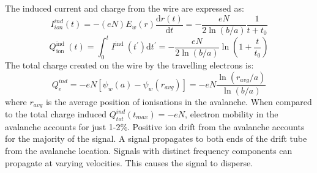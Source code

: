 The induced current and charge from the wire are expressed as:
 \begin{equation}
    I_{i o n}^{i n d}(t)=-(e N) E_w(r) \frac{\mathrm{d} r(t)}{\mathrm{d} t}=-\frac{e N}{2 \ln (b / a)} \frac{1}{t+t_0}
    \end{equation}
    \begin{equation}
        Q_{\text {ion }}^{\text {ind }}(t)=\int_0^t I^{\text {ind }}\left(t^{\prime}\right) \mathrm{d} t^{\prime}=-\frac{e N}{2 \ln (b / a)} \ln \left(1+\frac{t}{t_0}\right)
        \end{equation}
The total charge created on the wire by the travelling electrons is:
\begin{equation}
    Q_e^{i n d}=-e N\left[\psi_w(a)-\psi_w\left(r_{a v g}\right)\right]=-e N \frac{\ln \left(r_{a v g} / a\right)}{\ln (b / a)}
    \end{equation}
    where $r_{avg}$ is the average position of ionisations in the avalanche. When compared to the total charge 
    induced $Q^{ind}_{tot}(t_{max}) = -eN$, electron mobility in the avalanche accounts for just 1-2\%. 
    Positive ion drift from the avalanche accounts for the majority of the signal. A signal propagates 
    to both ends of the drift tube from the avalanche location.
    Signals with distinct frequency components can propagate at varying velocities. This causes the signal to disperse.
